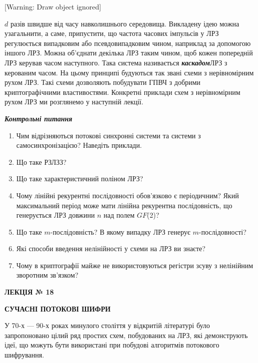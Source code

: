 {{[Warning: Draw object ignored] 

 $d$ разів швидше від часу навколишнього середовища. Викладену ідею можна
узагальнити, а саме, припустити, що частота часових імпульсів у ЛРЗ регулюється
випадковим або псевдовипадковим чином, наприклад за допомогою іншого ЛРЗ. Можна
об’єднати декілька ЛРЗ таким чином, щоб кожен попередній ЛРЗ керував часом
наступного. Така система називається \textbf{\textit{каскадом}}ЛРЗ з
керованим часом. На цьому принципі будуються так звані схеми з нерівномірним
рухом ЛРЗ. Такі схеми дозволяють побудувати ГПВЧ з добрими криптографічними
властивостями. Конкретні приклади схем з нерівномірним рухом ЛРЗ ми розглянемо
у наступній лекції.


\bigskip

{\centering\bfseries\itshape
Контрольні питання
\par}


\bigskip

\liststyleWWviiiNumlvi
\begin{enumerate}
\item Чим відрізняються потокові синхронні системи та системи з
самосинхронізацією? Наведіть приклади.
\item Що таке РЗЛЗЗ?
\item Що таке характеристичний поліном ЛРЗ?
\item Чому лінійні рекурентні послідовності обов’язково є періодичним? Який
максимальний період може мати лінійна рекурентна послідовність, що генерується
ЛРЗ довжини  $n$ над полем $GF$(2)? 
\item Що таке  $m$-послідовність? В якому випадку ЛРЗ генерує 
$m$-послідовності?
\item Які способи введення нелінійності у схеми на ЛРЗ ви знаєте?
\item Чому в криптографії майже не використовуються регістри зсуву з нелінійним
зворотним зв’язком?
\end{enumerate}

\bigskip


\bigskip


\bigskip

{\bfseries
ЛЕКЦІЯ № 18}


\bigskip

{\centering\bfseries
СУЧАСНІ  ПОТОКОВІ  ШИФРИ
\par}


\bigskip


\bigskip

У 70-х --- 90-х роках минулого століття у відкритій літературі було запропоновано
цілий ряд простих схем, побудованих на ЛРЗ, які демонструють ідеї, що можуть
бути використані при побудові алгоритмів потокового шифрування.

}}
